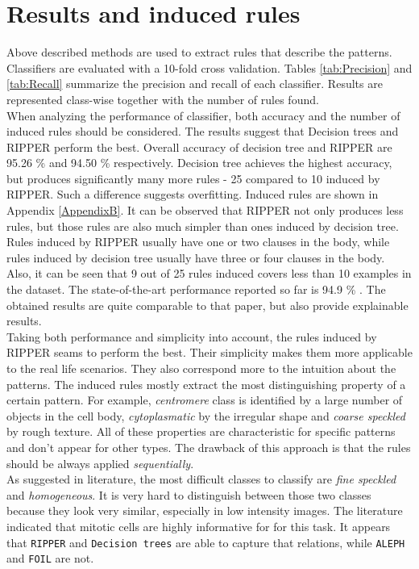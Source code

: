 \section{Results and induced rules}

Above described methods are used to extract rules that describe the patterns. Classifiers are evaluated with a 10-fold cross validation. Tables \ref{tab:Precision} and \ref{tab:Recall} summarize the precision and recall of each classifier. Results are represented class-wise together with the number of rules found. \\

When analyzing the performance of classifier, both accuracy and the number of induced rules should be considered. The results suggest that Decision trees and RIPPER perform the best. Overall accuracy of decision tree and RIPPER are 95.26 \% and 94.50 \% respectively. Decision tree achieves the highest accuracy, but produces significantly many more rules - 25 compared to 10 induced by RIPPER. Such a difference suggests overfitting. Induced rules are shown in Appendix \ref{AppendixB}. It can be observed that RIPPER not only produces less rules, but those rules are also much simpler than ones induced by decision tree. Rules induced by RIPPER usually have one or two clauses in the body, while rules induced by decision tree usually have three or four clauses in the body. Also, it can be seen that 9 out of 25 rules induced covers less than 10 examples in the dataset. The state-of-the-art performance reported so far is 94.9 \% \cite{Wiliem}. The obtained results are quite comparable to that paper, but also provide explainable results.\\

Taking both performance and simplicity into account, the rules induced by RIPPER seams to perform the best. Their simplicity makes them more applicable to the real life scenarios. They also correspond more to the intuition about the patterns. The induced rules mostly extract the most distinguishing property of a certain pattern. For example, \textit{centromere} class is identified by a large number of objects in the cell body, \textit{cytoplasmatic} by the irregular shape and \textit{coarse speckled} by rough texture. All of these properties are characteristic for specific patterns and don't appear for other types. The drawback of this approach is that the rules should be always applied \textit{sequentially}. \\

As suggested in literature, the most difficult classes to classify are \textit{fine speckled} and \textit{homogeneous}. It is very hard to distinguish between those two classes because they look very similar, especially in low intensity images. The literature indicated that mitotic cells are highly informative for for this task. It appears that  \texttt{RIPPER} and \texttt{Decision trees} are able to capture that relations, while \texttt{ALEPH} and \texttt{FOIL} are not.

